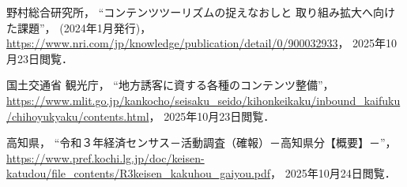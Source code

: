 \documentclass{docs}
\begin{document}
\begin{thebibliography}{99}
    野村総合研究所，
    “コンテンツツーリズムの捉えなおしと 取り組み拡大へ向けた課題”，
    (2024年1月発行)，
    \url{https://www.nri.com/jp/knowledge/publication/detail/0/900032933}，
    2025年10月23日閲覧．

    国土交通省 観光庁，
    “地方誘客に資する各種のコンテンツ整備”，
    \url{https://www.mlit.go.jp/kankocho/seisaku_seido/kihonkeikaku/inbound_kaifuku/chihoyukyaku/contents.html}，
    2025年10月23日閲覧．

    高知県，
    “令和３年経済センサス－活動調査（確報）－高知県分【概要】－”，
    \url{https://www.pref.kochi.lg.jp/doc/keisen-katudou/file_contents/R3keisen_kakuhou_gaiyou.pdf}，
    2025年10月24日閲覧．
\end{thebibliography}
\end{document}
